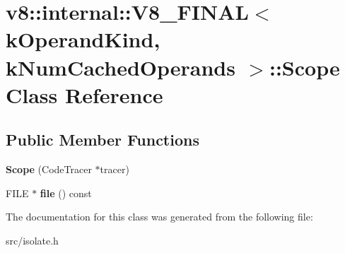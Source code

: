 \hypertarget{classv8_1_1internal_1_1_v8___f_i_n_a_l_1_1_scope}{}\section{v8\+:\+:internal\+:\+:V8\+\_\+\+F\+I\+N\+A\+L$<$ k\+Operand\+Kind, k\+Num\+Cached\+Operands $>$\+:\+:Scope Class Reference}
\label{classv8_1_1internal_1_1_v8___f_i_n_a_l_1_1_scope}
\subsection*{Public Member Functions}
\begin{DoxyCompactItemize}
\item 
\hypertarget{classv8_1_1internal_1_1_v8___f_i_n_a_l_1_1_scope_ab0eb766121459aa7b34bc38d47d9f6d8}{}{\bfseries Scope} (Code\+Tracer $\ast$tracer)\label{classv8_1_1internal_1_1_v8___f_i_n_a_l_1_1_scope_ab0eb766121459aa7b34bc38d47d9f6d8}

\item 
\hypertarget{classv8_1_1internal_1_1_v8___f_i_n_a_l_1_1_scope_a5ef8c772e7036bec48600af7efa8a8fa}{}F\+I\+L\+E $\ast$ {\bfseries file} () const \label{classv8_1_1internal_1_1_v8___f_i_n_a_l_1_1_scope_a5ef8c772e7036bec48600af7efa8a8fa}

\end{DoxyCompactItemize}


The documentation for this class was generated from the following file\+:\begin{DoxyCompactItemize}
\item 
src/isolate.\+h\end{DoxyCompactItemize}
